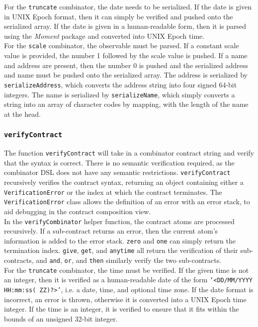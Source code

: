 For the \texttt{truncate} combinator, the date needs to be serialized. If the date is given in UNIX Epoch format, then it can simply be verified and pushed onto the serialized array. If the date is given in a human-readable form, then it is parsed using the \textit{Moment} package and converted into UNIX Epoch time. \\

For the \texttt{scale} combinator, the observable must be parsed. If a constant scale value is provided, the number 1 followed by the scale value is pushed. If a name and address are present, then the number 0 is pushed and the serialized address and name must be pushed onto the serialized array. The address is serialized by \texttt{serializeAddress}, which converts the address string into four signed 64-bit integers. The name is serialized by \texttt{serializeName}, which simply converts a string into an array of character codes by mapping, with the length of the name at the head.

\subsubsection{\texttt{verifyContract}}

The function \texttt{verifyContract} will take in a combinator contract string and verify that the syntax is correct. There is no semantic verification required, as the combinator DSL does not have any semantic restrictions. \texttt{verifyContract} recursively verifies the contract syntax, returning an object containing either a \texttt{VerificationError} or the index at which the contract terminates. The \texttt{VerificationError} class allows the definition of an error with an error stack, to aid debugging in the contract composition view. \\

In the \texttt{verifyCombinator} helper function, the contract atoms are processed recursively. If a sub-contract returns an error, then the current atom's information is added to the error stack. \texttt{zero} and \texttt{one} can simply return the termination index. \texttt{give}, \texttt{get}, and \texttt{anytime} all return the verification of their sub-contracts, and \texttt{and}, \texttt{or}, and \texttt{then} similarly verify the two sub-contracts. \\

For the \texttt{truncate} combinator, the time must be verified. If the given time is not an integer, then it is verified as a human-readable date of the form \texttt{`<DD/MM/YYYY HH:mm:ss( ZZ)?>'}, i.e. a date, time, and optional time zone. If the date format is incorrect, an error is thrown, otherwise it is converted into a UNIX Epoch time integer. If the time is an integer, it is verified to ensure that it fits within the bounds of an unsigned 32-bit integer. \\

